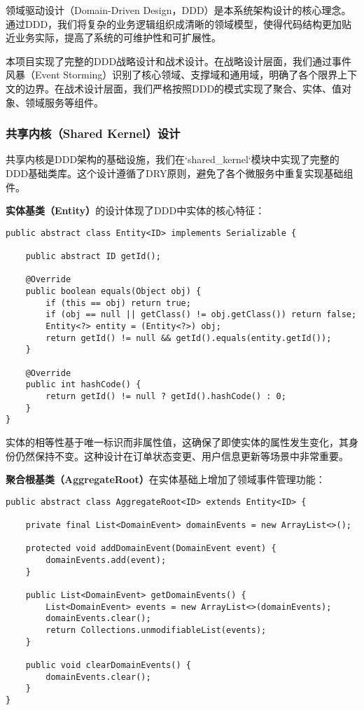 \documentclass[a4paper,12pt]{article}
\begin{document}
领域驱动设计（Domain-Driven Design，DDD）是本系统架构设计的核心理念。通过DDD，我们将复杂的业务逻辑组织成清晰的领域模型，使得代码结构更加贴近业务实际，提高了系统的可维护性和可扩展性。

本项目实现了完整的DDD战略设计和战术设计。在战略设计层面，我们通过事件风暴（Event Storming）识别了核心领域、支撑域和通用域，明确了各个限界上下文的边界。在战术设计层面，我们严格按照DDD的模式实现了聚合、实体、值对象、领域服务等组件。

\subsubsection{共享内核（Shared Kernel）设计}

共享内核是DDD架构的基础设施，我们在`shared_kernel`模块中实现了完整的DDD基础类库。这个设计遵循了DRY原则，避免了各个微服务中重复实现基础组件。

\textbf{实体基类（Entity）}的设计体现了DDD中实体的核心特征：

\begin{lstlisting}[caption=Entity基类实现]
public abstract class Entity<ID> implements Serializable {
    
    public abstract ID getId();
    
    @Override
    public boolean equals(Object obj) {
        if (this == obj) return true;
        if (obj == null || getClass() != obj.getClass()) return false;
        Entity<?> entity = (Entity<?>) obj;
        return getId() != null && getId().equals(entity.getId());
    }
    
    @Override
    public int hashCode() {
        return getId() != null ? getId().hashCode() : 0;
    }
}
\end{lstlisting}

实体的相等性基于唯一标识而非属性值，这确保了即使实体的属性发生变化，其身份仍然保持不变。这种设计在订单状态变更、用户信息更新等场景中非常重要。

\textbf{聚合根基类（AggregateRoot）}在实体基础上增加了领域事件管理功能：

\begin{lstlisting}[caption=AggregateRoot基类实现]
public abstract class AggregateRoot<ID> extends Entity<ID> {
    
    private final List<DomainEvent> domainEvents = new ArrayList<>();
    
    protected void addDomainEvent(DomainEvent event) {
        domainEvents.add(event);
    }
    
    public List<DomainEvent> getDomainEvents() {
        List<DomainEvent> events = new ArrayList<>(domainEvents);
        domainEvents.clear();
        return Collections.unmodifiableList(events);
    }
    
    public void clearDomainEvents() {
        domainEvents.clear();
    }
}
\end{lstlisting}
\end{document}
